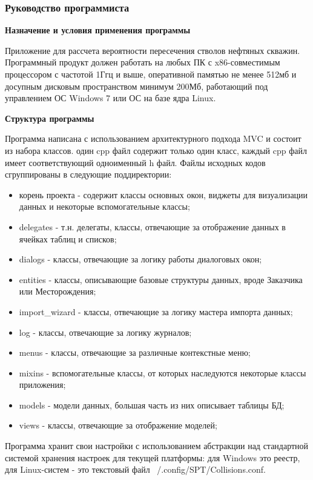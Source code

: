 \subsubsection*{Руководство программиста}

\textbf{Назначение и условия применения программы}

Приложение для рассчета вероятности пересечения стволов нефтяных скважин.
Программный продукт должен работать на любых ПК с x86-совместимым процессором с частотой 1Ггц и выше,
оперативной памятью не менее 512мб и досупным дисковым пространством минимум 200Мб, работающий под
управлением ОС Windows 7 или ОС на базе ядра Linux.

\textbf{Структура программы}

Программа написана с использованием архитектурного подхода MVC и состоит из набора классов. один cpp файл содержит только
один класс, каждый cpp файл имеет соответствующий одноименный h файл. Файлы исходных кодов сгруппированы в следующие
поддиректории:
\begin{itemize}
  \item корень проекта - содержит классы основных окон, виджеты для визуализации данных и некоторые вспомогательные классы;
  \item delegates - т.н. делегаты, классы, отвечающие за отображение данных в ячейках таблиц и списков;
  \item dialogs - классы, отвечающие за логику работы диалоговых окон;
  \item entities - классы, описывающие базовые структуры данных, вроде Заказчика или Месторождения;
  \item import\_wizard - классы, отвечающие за логику мастера импорта данных;
  \item log - классы, отвечающие за логику журналов;
  \item menus - классы, отвечающие за различные контекстные меню;
  \item mixins - вспомогательные классы, от которых наследуются некоторые классы приложения;
  \item models - модели данных, большая часть из них описывает таблицы БД;
  \item views - классы, отвечающие за отображение моделей;
\end{itemize}

Программа хранит свои настройки с использованием абстракции над стандартной системой хранения настроек для текущей платформы:
для Windows это реестр, для Linux-систем - это текстовый файл ~/.config/SPT/Collisions.conf.

